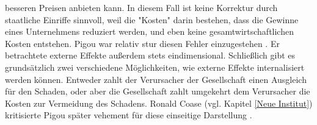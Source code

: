 besseren Preisen anbieten kann. In diesem Fall ist keine Korrektur durch staatliche Einriffe sinnvoll, weil die "Kosten" darin bestehen, dass die Gewinne eines Unternehmens reduziert werden, und eben keine gesamtwirtschaftlichen Kosten entstehen. Pigou war relativ stur diesen Fehler einzugestehen \parencite[S. 153]{Johnson1960}. Er betrachtete externe Effekte außerdem stets eindimensional. Schließlich gibt es grundsätzlich zwei verschiedene Möglichkeiten, wie externe Effekte internalisiert werden können. Entweder zahlt der Verursacher der Gesellschaft einen Ausgleich für den Schaden, oder aber die Gesellschaft zahlt umgekehrt dem Verursacher die Kosten zur Vermeidung des Schadens. Ronald Coase (vgl. Kapitel \ref{Neue Institut}) kritisierte Pigou später vehement für diese einseitige Darstellung \parencite[S. 243]{Cansier1989}.

